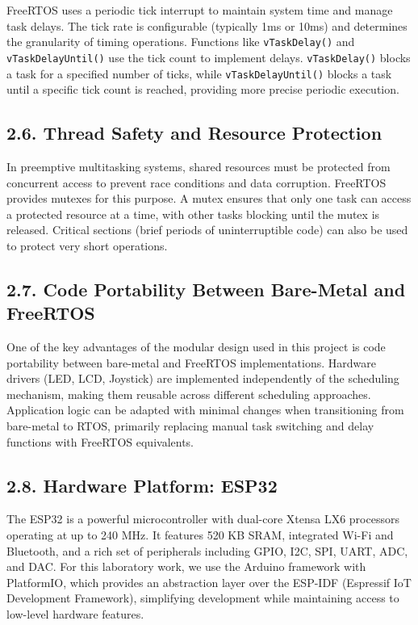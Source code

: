 \documentclass[12pt]{article}
\begin{document}
FreeRTOS uses a periodic tick interrupt to maintain system time and manage task delays. The tick rate is configurable (typically 1ms or 10ms) and determines the granularity of timing operations. Functions like \texttt{vTaskDelay()} and \texttt{vTaskDelayUntil()} use the tick count to implement delays. \texttt{vTaskDelay()} blocks a task for a specified number of ticks, while \texttt{vTaskDelayUntil()} blocks a task until a specific tick count is reached, providing more precise periodic execution.

\subsection*{2.6. Thread Safety and Resource Protection}

In preemptive multitasking systems, shared resources must be protected from concurrent access to prevent race conditions and data corruption. FreeRTOS provides mutexes for this purpose. A mutex ensures that only one task can access a protected resource at a time, with other tasks blocking until the mutex is released. Critical sections (brief periods of uninterruptible code) can also be used to protect very short operations.

\subsection*{2.7. Code Portability Between Bare-Metal and FreeRTOS}

One of the key advantages of the modular design used in this project is code portability between bare-metal and FreeRTOS implementations. Hardware drivers (LED, LCD, Joystick) are implemented independently of the scheduling mechanism, making them reusable across different scheduling approaches. Application logic can be adapted with minimal changes when transitioning from bare-metal to RTOS, primarily replacing manual task switching and delay functions with FreeRTOS equivalents.

\subsection*{2.8. Hardware Platform: ESP32}

The ESP32 is a powerful microcontroller with dual-core Xtensa LX6 processors operating at up to 240 MHz. It features 520 KB SRAM, integrated Wi-Fi and Bluetooth, and a rich set of peripherals including GPIO, I2C, SPI, UART, ADC, and DAC. For this laboratory work, we use the Arduino framework with PlatformIO, which provides an abstraction layer over the ESP-IDF (Espressif IoT Development Framework), simplifying development while maintaining access to low-level hardware features.
\end{document}
